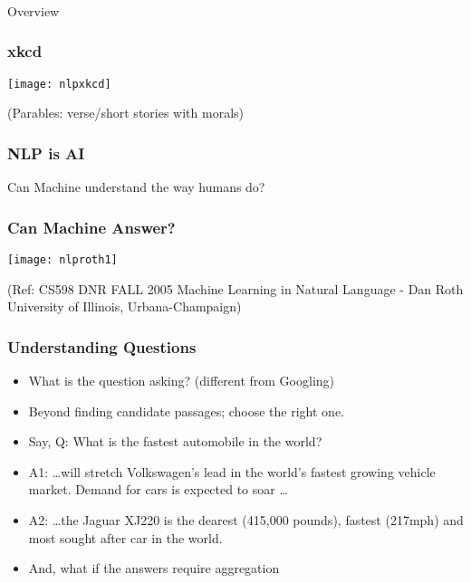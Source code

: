 \begin{frame}[fragile]\frametitle{}

\begin{center}
{\Large Overview}
\end{center}
\end{frame}

\begin{frame}[fragile]\frametitle{xkcd}
\begin{center}
\texttt{[image: nlpxkcd]}
\end{center}

{\tiny (Parables: verse/short stories with morals)}
\end{frame}

\begin{frame}[fragile]\frametitle{NLP is AI}
Can Machine understand the way humans do?
\end{frame}

\begin{frame}[fragile]\frametitle{Can Machine Answer?}
\begin{center}
\texttt{[image: nlproth1]}
\end{center}

\tiny{(Ref: CS598 DNR FALL 2005 Machine Learning in Natural Language - Dan Roth
University of Illinois, Urbana-Champaign)}
\end{frame}

\begin{frame}[fragile]\frametitle{Understanding Questions}
  \begin{itemize}
    \item What is the question asking? (different from Googling) 
    \item Beyond finding candidate passages; choose the right one.
	\item Say, Q: What is the fastest automobile in the world?
\item A1: \ldots will stretch Volkswagen’s lead in the world’s fastest 
growing vehicle market. Demand for cars is expected to soar \ldots
\item A2: \ldots  the Jaguar XJ220 is the dearest (415,000 pounds), fastest (217mph) and most sought after car in the world.
\item And, what if the answers require aggregation

  \end{itemize}
\end{frame}

